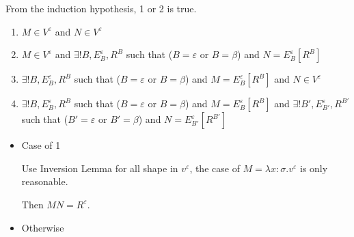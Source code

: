\begin{itemize}
\begin{itemize}
	      	      From the induction hypothesis, 1 or 2 is true.
	      	      	      	      	      	      	      	      	      	      	      	      		      	      	      	      	      	      	      	      
	      	      \begin{enumerate}
	      	      	\item $ M \in V^\varepsilon$ and $ N \in V^\varepsilon$
	      	      	\item $ M \in V^\varepsilon$ and $\exists ! B, E^\varepsilon_B, R^B$ such that ($B = \varepsilon$ or $B = \beta$) and $N = E^\varepsilon_B[R^B]$
	      	      	\item $\exists ! B, E^\varepsilon_B, R^B$ such that ($B = \varepsilon$ or $B = \beta$) and $M = E^\varepsilon_B[R^B]$ and $ N \in V^\varepsilon$
	      	      	\item $\exists ! B, E^\varepsilon_B, R^B$ such that ($B = \varepsilon$ or $B = \beta$) and $M = E^\varepsilon_B[R^B]$ and $\exists ! B', E^\varepsilon_{B'}, R^{B'}$ such that ($B' = \varepsilon$ or $B' = \beta$) and $N = E^\varepsilon_{B'}[R^{B'}]$
	      	      \end{enumerate}
	      	      	      	      	      	      	      	      	      	      	      	      		      	      	      	      	      	      	      	      
	      	      \begin{itemize}
	      	      	\item Case of 1
	      	      	      	      	      	      	      	      	      	      	      	      	      	      	      	      	      	      		      	      	      	      	      	      	      	      	      	      	      	      
	      	      	      Use Inversion Lemma for all shape in $v^\varepsilon$, the case of $ M = \lambda x:\sigma.v^\varepsilon$ is only reasonable.
	      	      	      	      	      	      	      	      	      	      	      	      	      	      	      	      	      	      		      	      	      	      	      	      	      	      	      	      	      	      
	      	      	      Then $M N = R^\varepsilon$.
	      	      	      	      	      	      	      	      	      	      	      	      	      	      	      	      	      	      		      	      	      	      	      	      	      	      	      	      	      	      
	      	      	\item Otherwise
	      	      	      	      	      	      	      	      	      	      	      	      	      	      	      	      	      	      		      	      	      	      	      	      	      	      	      	      	      	      

\end{itemize}
\end{itemize}
\end{itemize}
